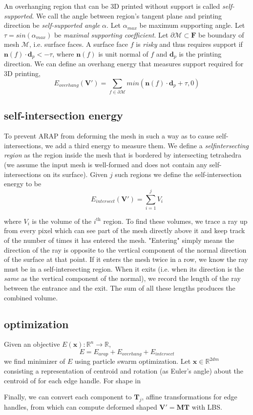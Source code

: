 \documentclass[12pt]{article}
\newcommand{\R}{\mathbb{R}}
\newcommand{\calM}{\mathcal{M}}
\newcommand{\bV}{\mathbf{V}}
\newcommand{\bF}{\mathbf{F}}
\newcommand{\bM}{\mathbf{M}}
\newcommand{\bT}{\mathbf{T}}
\newcommand{\bn}{\mathbf{n}}
\newcommand{\bd}{\mathbf{d}}
\newcommand{\bx}{\mathbf{x}}
\begin{document}
An overhanging region that can be 3D printed without support is called \textit{self-supported}. We call the angle between region's tangent plane and printing direction be \textit{self-supported angle} $\alpha$. Let $\alpha_{max}$ be maximum supporting angle. Let $\tau = sin(\alpha_{max})$ be \textit{maximal supporting coefficient}. Let $\partial \calM \subset \bF$ be boundary of mesh $\calM$, i.e. surface faces. A surface face $f$ is \textit{risky} and thus requires support if $\bn(f) \cdot \bd_{p} < -\tau$, where $\bn(f)$ is unit normal of $f$ and $\bd_{p}$ is the printing direction. We can define an overhang energy that measures support required for 3D printing,
\[
    E_{overhang}(\bV') = \sum_{f\in \partial \calM} min(\bn(f) \cdot \bd_{p} + \tau, 0)
\]


\subsection*{self-intersection energy}

To prevent ARAP from deforming the mesh in such a way as to cause self-intersections, we add a third energy to measure them. We define a \textit{self\-intersecting region} as the region inside the mesh that is bordered by intersecting tetrahedra (we assume the input mesh is well-formed and does not contain any self-intersections on its surface). Given $j$ such regions we define the self-intersection energy to be
\[
	E_{intersect}(\bV') = \sum_{i=1}^j V_i
\]

where $V_i$ is the volume of the $i^{\text{th}}$ region. To find these volumes, we trace a ray up from every pixel which can see part of the mesh directly above it and keep track of the number of times it has entered the mesh. "Entering" simply means the direction of the ray is opposite to the vertical component of the normal direction of the surface at that point. If it enters the mesh twice in a row, we know the ray must be in a self-intersecting region. When it exits (i.e. when its direction is the \textit{same} as the vertical component of the normal), we record the length of the ray between the entrance and the exit. The sum of all these lengths produces the combined volume.


\subsection*{optimization}

Given an objective $E(\bx): \R^n \rightarrow \R$, 
\[
    E = E_{arap} + E_{overhang} + E_{intersect}
\]
we find minimizer of $E$ using particle swarm optimization. Let $\bx \in \R^{2dm}$ consisting a representation of centroid and rotation (as Euler's angle) about the centroid of for each edge handle. For shape in 

Finally, we can convert each component to $\bT_j$, affine transformations for edge handles, from which can compute deformed shaped $\bV' = \bM \bT$ with LBS.


 
\end{document}
